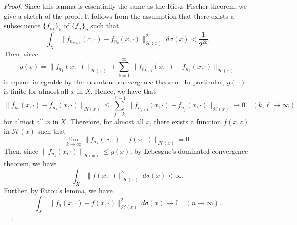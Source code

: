 \documentclass[10pt,a4paper]{amsart}
\newcommand{\cH}{{\mathcal H}}
\begin{document}
\begin{proof}
Since this lemma is essentially the same as the Riesz--Fischer theorem, 
we give a sketch of the proof. 
It follows from the assumption that 
there exists a subsequence $\{f_{n_k}\}_k$ of $\{f_n\}_n$ such that 
\[
\int_X \|f_{n_{k+1}}(x,\cdot)-f_{n_k}(x,\cdot)\|_{\cH(x)}^2\ d\sigma(x)<\frac{1}{2^{2k}}. 
\]
Then, since 
\[
g(x)=\|f_{n_1}(x,\cdot)\|_{\cH(x)}+\sum_{k=1}^{\infty}\|f_{n_{k+1}}(x,\cdot)-f_{n_k}(x,\cdot)\|_{\cH(x)} 
\]
is square integrable by the monotone convergence theorem. 
In particular, $g(x)$ is finite for almost all $x$ in $X$. 
Hence,
we have that
\[
\|f_{n_{\ell}}(x,\cdot)-f_{n_k}(x,\cdot)\|_{\cH(x)}
\leq \sum_{j=k}^{\ell-1}\|f_{n_{j+1}}(x,\cdot)-f_{n_j}(x,\cdot)\|_{\cH(x)}\to 0\quad(k,\ell\to\infty)
\]
for almost all $x$ in $X$. 
Therefore, 
for almost all $x$,   
there exists a function $f(x, z)$ in $\cH(x)$ 
such that 
\[
\lim_{k\to \infty}\|f_{n_k}(x,\cdot)-f(x,\cdot)\|_{\cH(x)}=0. 
\]
Then, 
since $\|f_{n_k}(x,\cdot)\|_{\cH(x)}\leq g(x)$, 
by Lebesgue's dominated convergence theorem, we have 
\[
\int_X\|f(x,\cdot)\|_{\cH(x)}^2\ d\sigma(x)<\infty.
\]
Further, 
by Fatou's lemma, we have 
\[
\int_X\|f_n(x,\cdot)-f(x,\cdot)\|_{\cH(x)}^2\ d\sigma(x)\to 0\quad(n\to \infty).
\] 
\end{proof}
\end{document}
